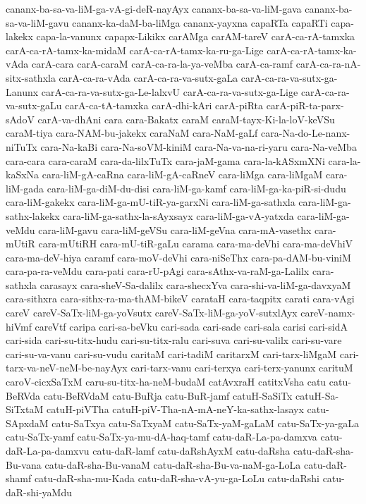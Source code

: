 {cananx-ba-sa-va-liM-ga-vA-gi-deR-nayAyx
cananx-ba-sa-va-liM-gava
cananx-ba-sa-va-liM-gavu
cananx-ka-daM-ba-liMga
cananx-yayxna
capaRTa
capaRTi
capa-lakekx
capa-la-vanunx
capapx-Likikx
carAMga
carAM-tareV
carA-ca-rA-tamxka
carA-ca-rA-tamx-ka-midaM
carA-ca-rA-tamx-ka-ru-ga-Lige
carA-ca-rA-tamx-ka-vAda
carA-cara
carA-caraM
carA-ca-ra-la-ya-veMba
carA-ca-ramf
carA-ca-ra-nA-sitx-sathxla
carA-ca-ra-vAda
carA-ca-ra-va-sutx-gaLa
carA-ca-ra-va-sutx-ga-Lanunx
carA-ca-ra-va-sutx-ga-Le-lalxvU
carA-ca-ra-va-sutx-ga-Lige
carA-ca-ra-va-sutx-gaLu
carA-ca-tA-tamxka
carA-dhi-kAri
carA-piRta
carA-piR-ta-parx-sAdoV
carA-va-dhAni
cara
cara-Bakatx
caraM
caraM-tayx-Ki-la-loV-keVSu
caraM-tiya
cara-NAM-bu-jakekx
caraNaM
cara-NaM-gaLf
cara-Na-do-Le-nanx-niTuTx
cara-Na-kaBi
cara-Na-soVM-kiniM
cara-Na-va-na-ri-yaru
cara-Na-veMba
cara-cara
cara-caraM
cara-da-lilxTuTx
cara-jaM-gama
cara-la-kASxmXNi
cara-la-kaSxNa
cara-liM-gA-caRna
cara-liM-gA-caRneV
cara-liMga
cara-liMgaM
cara-liM-gada
cara-liM-ga-diM-du-disi
cara-liM-ga-kamf
cara-liM-ga-ka-piR-si-dudu
cara-liM-gakekx
cara-liM-ga-mU-tiR-ya-garxNi
cara-liM-ga-sathxla
cara-liM-ga-sathx-lakekx
cara-liM-ga-sathx-la-sAyxsayx
cara-liM-ga-vA-yatxda
cara-liM-ga-veMdu
cara-liM-gavu
cara-liM-geVSu
cara-liM-geVna
cara-mA-vasethx
cara-mUtiR
cara-mUtiRH
cara-mU-tiR-gaLu
carama
cara-ma-deVhi
cara-ma-deVhiV
cara-ma-deV-hiya
caramf
cara-moV-deVhi
cara-niSeThx
cara-pa-dAM-bu-viniM
cara-pa-ra-veMdu
cara-pati
cara-rU-pAgi
cara-sAthx-va-raM-ga-Lalilx
cara-sathxla
carasayx
cara-sheV-Sa-dalilx
cara-shecxYva
cara-shi-va-liM-ga-davxyaM
cara-sithxra
cara-sithx-ra-ma-thAM-bikeV
carataH
cara-taqpitx
carati
cara-vAgi
careV
careV-SaTx-liM-ga-yoVsutx
careV-SaTx-liM-ga-yoV-sutxlAyx
careV-namx-hiVmf
careVtf
caripa
cari-sa-beVku
cari-sada
cari-sade
cari-sala
carisi
cari-sidA
cari-sida
cari-su-titx-hudu
cari-su-titx-ralu
cari-suva
cari-su-valilx
cari-su-vare
cari-su-va-vanu
cari-su-vudu
caritaM
cari-tadiM
caritarxM
cari-tarx-liMgaM
cari-tarx-va-neV-neM-be-nayAyx
cari-tarx-vanu
cari-terxya
cari-terx-yanunx
carituM
caroV-cicxSaTxM
caru-su-titx-ha-neM-budaM
catAvxraH
catitxVsha
catu
catu-BeRVda
catu-BeRVdaM
catu-BuRja
catu-BuR-jamf
catuH-SaSiTx
catuH-Sa-SiTxtaM
catuH-piVTha
catuH-piV-Tha-nA-mA-neY-ka-sathx-lasayx
catu-SApxdaM
catu-SaTxya
catu-SaTxyaM
catu-SaTx-yaM-gaLaM
catu-SaTx-ya-gaLa
catu-SaTx-yamf
catu-SaTx-ya-mu-dA-haq-tamf
catu-daR-La-pa-damxva
catu-daR-La-pa-damxvu
catu-daR-lamf
catu-daRshAyxM
catu-daRsha
catu-daR-sha-Bu-vana
catu-daR-sha-Bu-vanaM
catu-daR-sha-Bu-va-naM-ga-LoLa
catu-daR-shamf
catu-daR-sha-mu-Kada
catu-daR-sha-vA-yu-ga-LoLu
catu-daRshi
catu-daR-shi-yaMdu
}
